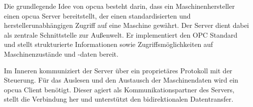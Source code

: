 Die grundlegende Idee von \acs{opcua} besteht darin, dass ein Maschinenhersteller einen \acs{opcua} Server bereitstellt, der einen standardisierten und herstellerunabhängigen Zugriff auf eine Maschine gewährt.
Der Server dient dabei als zentrale Schnittstelle zur Außenwelt. 
Er implementiert den OPC Standard und stellt strukturierte Informationen sowie Zugriffsmöglichkeiten auf Maschinenzustände und -daten bereit.

Im Inneren kommuniziert der Server über ein proprietäres Protokoll mit der Steuerung.
Für das Auslesen und den Austausch der Maschinendaten wird ein \acs{opcua} Client benötigt.
Dieser agiert als Kommunikationspartner des Servers, stellt die Verbindung her und unterstützt den bidirektionalen Datentransfer. \cite{OPCUA}